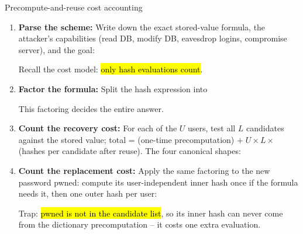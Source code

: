 \documentclass[12pt, a4paper]{article}
\newcommand{\term}[1]{\textbf{\textit{#1}}}        %
\newcommand{\imp}[1]{\hl{#1}}                       %
\begin{document}
\begin{schemebox}{Precompute-and-reuse cost accounting}
\begin{enumerate}[label=\textbf{Step \arabic*:}, leftmargin=*]
    \item \textbf{Parse the scheme:} Write down the exact stored-value formula, the attacker's capabilities (read DB, modify DB, eavesdrop logins, compromise server), and the goal:Recall the cost model: \imp{only hash evaluations count}.
    \item \textbf{Factor the formula:} Split the hash expression intoThis factoring decides the entire answer.
    \item \textbf{Count the recovery cost:} For each of the $U$ users, test all $L$ candidates against the stored value; total = (one-time precomputation) $+\; U \times L \times$ (hashes per candidate after reuse). The four canonical shapes:
    \item \textbf{Count the replacement cost:} Apply the same factoring to the new password pwned: compute its user-independent inner hash once if the formula needs it, then one outer hash per user:Trap: \imp{pwned is not in the candidate list}, so its inner hash can never come from the dictionary precomputation -- it costs one extra evaluation.

\end{enumerate}
\end{schemebox}
\end{document}
